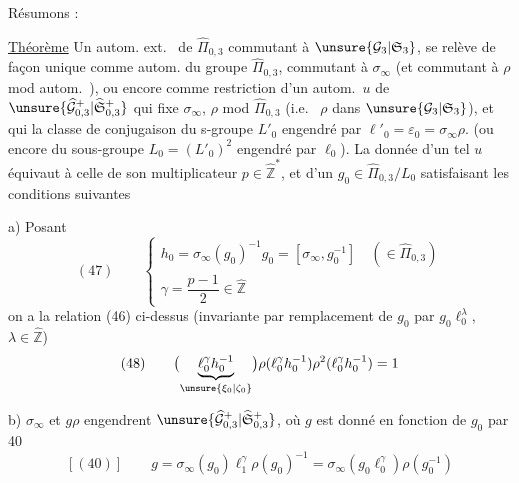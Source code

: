 
Résumons :

\uline{Théorème} Un autom. ext.\  de
$\widehat{\Pi}_{0,3}$ commutant à
$\unsure{\mathcal G_3|\mathfrak S_3}$, se relève de façon unique comme autom.
du groupe  $\widehat{\Pi}_{0,3}$, commutant à
$\sigma_\infty$ (et commutant à $\rho$ mod autom.\ ),
ou encore comme restriction d'un autom.\ $u$ de
$\unsure{\widehat{\mathcal G}_{0,3}^{+}|\widehat{\mathfrak S}_{0,3}^{+}}$
qui fixe $\sigma_\infty$,  $\rho$ mod $\widehat{\Pi}_{0,3}$
(i.e.\  $\rho$ dans $\unsure{\mathcal G_3|\mathfrak S_3}$),
et qui  la classe de conjugaison du s-groupe
 $L'_0$
 engendré par $\ell'_0=\varepsilon_0=\sigma_\infty\rho$.
(ou encore du sous-groupe  $L_0=(L'_0)^2$ engendré par $\ell_0$).
La donnée d'un tel $u$ équivaut à celle de son multiplicateur
$p\in\widehat{\mathbb Z}^{*}$, et d'un $g_0\in\widehat{\Pi}_{0,3}/L_0$
satisfaisant les conditions suivantes

 a) Posant
\[
(47)\qquad
\begin{cases}
h_0=\sigma_\infty(g_0)^{-1}g_0=[\sigma_\infty,g_0^{-1}]
   \quad(\in\widehat{\Pi}_{0,3})\\
\gamma=\dfrac{p-1}{2}\in\widehat{\mathbb Z}
\end{cases}
\]
on a la relation (46) ci-dessus (invariante par remplacement de $g_0$ par
$g_0\ell_0^\lambda$, $\lambda\in\widehat{\mathbb Z}$)
\[
(48)\qquad
\bigl(\underbrace{\ell_0^\gamma h_0^{-1}}_{\unsure{\xi_0|\zeta_0}}\bigr)
\rho(\ell_0^\gamma h_0^{-1})\rho^2(\ell_0^\gamma h_0^{-1})=1
\]

 b) $\sigma_\infty$ et $g\rho$ engendrent 
$\unsure{\widehat{\mathcal G}_{0,3}^{+}|\widehat{\mathfrak S}_{0,3}^{+}}$,
où $g$ est donné en fonction de $g_0$ par 40
\[
[(40)]\qquad
g=\sigma_\infty(g_0)\ell_1^\gamma\rho(g_0)^{-1}
=\sigma_\infty(g_0\ell_0^\gamma)\rho(g_0^{-1})
\]

